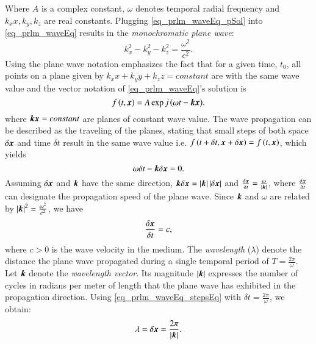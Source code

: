 Where $A$ is a complex constant, $\omega$ denotes temporal radial frequency and $k_{x}x,k_{y},k_{z}$ are real constants. 
Plugging \eqref{eq_prlm_waveEq_pSol} into \eqref{eq_prlm_waveEq} results in the \emph{monochromatic plane wave}:
\begin{equation}
\label{eq_prlm_waveEq_subs}
k_{x}^{2}-k_{y}^{2}-k_{z}^{2} = \frac{\omega^{2}}{c^{2}}.
\end{equation}
Using the plane wave notation emphasizes the fact that for a given time, $t_{0}$, all points on a plane given by $k_{x}x+k_{y}y+k_{z}z = constant$ are with the same wave value and the vector notation of \eqref{eq_prlm_waveEq}'s solution is
\begin{equation}
\label{eq_prlm_waveEq_finSol}
f\left({t,\boldsymbol{x}}\right)=A\exp{j\left({\omega{t}-\boldsymbol{k}\boldsymbol{x}}\right)}.
\end{equation}
where $\boldsymbol{k}\boldsymbol{x}=constant$ are planes of constant wave value.
The wave propagation can be described as the traveling of the planes, stating that small steps of both space $\delta{\boldsymbol{x}}$ and time $\delta{t}$ result in the same wave value i.e. $f\left({t+\delta{t},\boldsymbol{x}+\delta{\boldsymbol{x}}}\right) = f\left({t,\boldsymbol{x}}\right)$, which yields
\begin{equation}
\omega\delta{t}-\boldsymbol{k}\delta\boldsymbol{x}=0.
\end{equation}
Assuming $\delta\boldsymbol{x}$ and $\boldsymbol{k}$ have the same direction, $\boldsymbol{k}\delta\boldsymbol{x} = \left\vert\boldsymbol{k}\right\vert\left\vert\delta\boldsymbol{x}\right\vert$ and $\frac{\delta{\boldsymbol{x}}}{\delta{t}} = \frac{\omega}{\left\vert\boldsymbol{k}\right\vert}$, where $\frac{\delta{\boldsymbol{x}}}{\delta{t}}$ can designate the propagation speed of the plane wave. 
Since $\boldsymbol{k}$ and $\omega$ are related by $\left\vert\boldsymbol{k}\right\vert^{2}=\frac{\omega^{2}}{c^{2}}$, we have
\begin{equation}
\label{eq_prlm_waveEq_stepsEq}
\frac{\delta{\boldsymbol{x}}}{\delta{t}}=c,
\end{equation}
where $c>0$ is the wave velocity in the medium.
The \emph{wavelength} ($\lambda$) denote the distance the plane wave propagated during a single temporal period of $T=\frac{2\pi}{\omega}$.
Let $\boldsymbol{k}$ denote the \emph{wavelength vector}. 
Its magnitude $\left\vert\boldsymbol{k}\right\vert$ expresses the number of cycles in radians per meter of length that the plane wave has exhibited in the propagation direction.
Using \eqref{eq_prlm_waveEq_stepsEq} with $\delta{t} = \frac{2\pi}{\omega}$, we obtain:
\begin{equation}
\lambda=\delta{\boldsymbol{x}}=\frac{2\pi}{\left\vert\boldsymbol{k}\right\vert}.
\end{equation}
